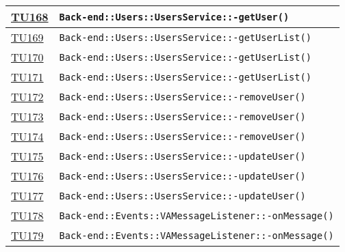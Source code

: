 \begin{longtable}{|>{\centering}m{1cm}|m{12cm}<{\centering}|}
\hyperlink{TU168}{TU168} & \texttt{Back-end::Users::UsersService::-\linebreak getUser()}\\ \hline

\hyperlink{TU169}{TU169} & \texttt{Back-end::Users::UsersService::-\linebreak getUserList()}\\ \hline

\hyperlink{TU170}{TU170} & \texttt{Back-end::Users::UsersService::-\linebreak getUserList()}\\ \hline

\hyperlink{TU171}{TU171} & \texttt{Back-end::Users::UsersService::-\linebreak getUserList()}\\ \hline

\hyperlink{TU172}{TU172} & \texttt{Back-end::Users::UsersService::-\linebreak removeUser()}\\ \hline

\hyperlink{TU173}{TU173} & \texttt{Back-end::Users::UsersService::-\linebreak removeUser()}\\ \hline

\hyperlink{TU174}{TU174} & \texttt{Back-end::Users::UsersService::-\linebreak removeUser()}\\ \hline

\hyperlink{TU175}{TU175} & \texttt{Back-end::Users::UsersService::-\linebreak updateUser()}\\ \hline

\hyperlink{TU176}{TU176} & \texttt{Back-end::Users::UsersService::-\linebreak updateUser()}\\ \hline

\hyperlink{TU177}{TU177} & \texttt{Back-end::Users::UsersService::-\linebreak updateUser()}\\ \hline

\hyperlink{TU178}{TU178} & \texttt{Back-end::Events::VAMessageListener::-\linebreak onMessage()}\\ \hline

\hyperlink{TU179}{TU179} & \texttt{Back-end::Events::VAMessageListener::-\linebreak onMessage()}\\ \hline


\end{longtable}
